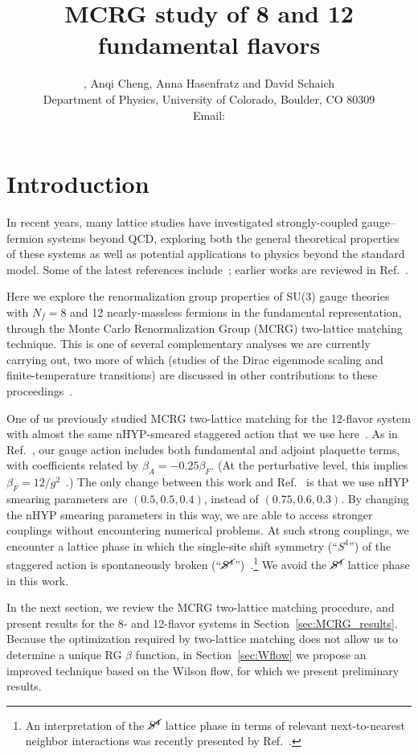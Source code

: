 \documentclass{PoS}
\title{MCRG study of 8 and 12 fundamental flavors}
\author{\speaker{Gregory Petropoulos}, Anqi Cheng, Anna Hasenfratz and David Schaich \\
  Department of Physics, University of Colorado, Boulder, CO 80309 \\
  Email: \email{gregory.petropoulos@colorado.edu}
}
\newcommand{\be}{\ensuremath{\beta} }
\newcommand{\Sb}{\ensuremath{\cancel{S^4}} }
\newcommand{\refcite}[1]{Ref.~\cite{#1}}
\newcommand{\secref}[1]{Section~\ref{#1}}
\begin{document}
\section{Introduction} %
In recent years, many lattice studies have investigated strongly-coupled gauge--fermion systems beyond QCD, exploring both the general theoretical properties of these systems as well as potential applications to physics beyond the standard model.
Some of the latest references include~\cite{Fodor:2012uu, Aoki:2012eq, Deuzeman:2012pv, Lin:2012iw}; earlier works are reviewed in \refcite{Neil:2012cb}. %

Here we explore the renormalization group properties of SU(3) gauge theories with $N_f = 8$ and 12 nearly-massless fermions in the fundamental representation, through the Monte Carlo Renormalization Group (MCRG) two-lattice matching technique.
This is one of several complementary analyses we are currently carrying out, two more of which (studies of the Dirac eigenmode scaling and finite-temperature transitions) are discussed in other contributions to these proceedings~\cite{Hasenfratz:2012fp, Schaich:2012fr}.

One of us previously studied MCRG two-lattice matching for the 12-flavor system with almost the same nHYP-smeared staggered action that we use here~\cite{Hasenfratz:2011xn}.
As in \refcite{Hasenfratz:2011xn}, our gauge action includes both fundamental and adjoint plaquette terms, with coefficients related by $\be_A = -0.25\be_F$.
(At the perturbative level, this implies $\be_F = 12 / g^2$~\cite{Cheng:2011ic}.)
The only change between this work and \refcite{Hasenfratz:2011xn} is that we use nHYP smearing parameters are $(0.5, 0.5, 0.4)$, instead of $(0.75, 0.6, 0.3)$.
By changing the nHYP smearing parameters in this way, we are able to access stronger couplings without encountering numerical problems.
At such strong couplings, we encounter a lattice phase in which the single-site shift symmetry (``$S^4$'') of the staggered action is spontaneously broken (``$\Sb$'')~\cite{Cheng:2011ic, Schaich:2012fr}.\footnote{An interpretation of the \Sb lattice phase in terms of relevant next-to-nearest neighbor interactions was recently presented by \refcite{Deuzeman:2012ee}.}
We avoid the \Sb lattice phase in this work.

In the next section, we review the MCRG two-lattice matching procedure, and present results for the 8- and 12-flavor systems in \secref{sec:MCRG_results}.
Because the optimization required by two-lattice matching does not allow us to determine a unique RG \be function, in \secref{sec:Wflow} we propose an improved technique based on the Wilson flow, for which we present preliminary results.
\end{document}

